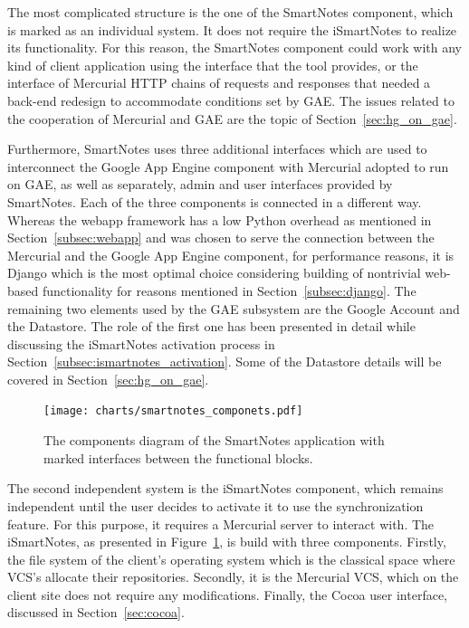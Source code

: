 The most complicated structure is the one of the SmartNotes component, which is marked as an individual system. It does not require the iSmartNotes to realize its functionality. For this reason, the SmartNotes component could work with any kind of client application using the interface that the tool provides, or the interface of Mercurial HTTP chains of requests and responses that needed a back-end redesign to accommodate conditions set by GAE. The issues related to the cooperation of Mercurial and GAE are the topic of Section~\ref{sec:hg_on_gae}.
 
Furthermore, SmartNotes uses three additional interfaces which are used to interconnect the Google App Engine component with Mercurial adopted to run on GAE, as well as separately, admin and user interfaces provided by SmartNotes. Each of the three components is connected in a different way. Whereas the webapp framework has a low Python overhead as mentioned in Section~\ref{subsec:webapp} and was chosen to serve the connection between the Mercurial and the Google App Engine component, for performance reasons, it is Django which is the most optimal choice considering building of nontrivial web-based functionality for reasons mentioned in Section~\ref{subsec:django}. The remaining two elements used by the GAE subsystem are the Google Account and the Datastore. The role of the first one has been presented in detail while discussing the iSmartNotes activation process in Section~\ref{subsec:ismartnotes_activation}. Some of the Datastore details will be covered in Section~\ref{sec:hg_on_gae}.
\begin{figure}[ht]
\begin{center}
\texttt{[image: charts/smartnotes\_componets.pdf]}
\caption{The components diagram of the SmartNotes application with marked interfaces between the functional blocks.}
\label{fig:smartnotes_components}
\end{center}
\end{figure}
 
The second independent system is the iSmartNotes component, which remains independent until the user decides to activate it to use the synchronization feature. For this purpose, it requires a Mercurial server to interact with. The iSmartNotes, as presented in Figure~\ref{fig:smartnotes_components}, is build with three components. Firstly, the file system of the client's operating system which is the classical space where VCS's allocate their repositories. Secondly, it is the Mercurial VCS, which on the client site does not require any modifications. Finally, the Cocoa user interface, discussed in Section~\ref{sec:cocoa}.
 
